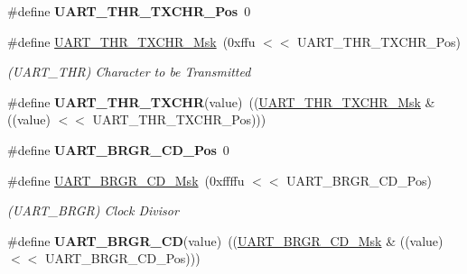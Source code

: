 \begin{DoxyCompactItemize}
\#define {\bfseries U\+A\+R\+T\+\_\+\+T\+H\+R\+\_\+\+T\+X\+C\+H\+R\+\_\+\+Pos}~0
\item 
\mbox{\label{group__SAME70__UART_ga81879da01aac4e5cf429e9707ab48983}} 
\#define \mbox{\hyperlink{group__SAME70__UART_ga81879da01aac4e5cf429e9707ab48983}{U\+A\+R\+T\+\_\+\+T\+H\+R\+\_\+\+T\+X\+C\+H\+R\+\_\+\+Msk}}~(0xffu $<$$<$ U\+A\+R\+T\+\_\+\+T\+H\+R\+\_\+\+T\+X\+C\+H\+R\+\_\+\+Pos)
\begin{DoxyCompactList}\small\item\em (U\+A\+R\+T\+\_\+\+T\+HR) Character to be Transmitted \end{DoxyCompactList}\item 
\mbox{\label{group__SAME70__UART_ga2234b30af6b81e5870b59df7c2de935d}} 
\#define {\bfseries U\+A\+R\+T\+\_\+\+T\+H\+R\+\_\+\+T\+X\+C\+HR}(value)~((\mbox{\hyperlink{group__SAMV71__UART_ga81879da01aac4e5cf429e9707ab48983}{U\+A\+R\+T\+\_\+\+T\+H\+R\+\_\+\+T\+X\+C\+H\+R\+\_\+\+Msk}} \& ((value) $<$$<$ U\+A\+R\+T\+\_\+\+T\+H\+R\+\_\+\+T\+X\+C\+H\+R\+\_\+\+Pos)))
\item 
\mbox{\label{group__SAME70__UART_gabe3a466943beb76f450710c221602c20}} 
\#define {\bfseries U\+A\+R\+T\+\_\+\+B\+R\+G\+R\+\_\+\+C\+D\+\_\+\+Pos}~0
\item 
\mbox{\label{group__SAME70__UART_ga73b3dd57455736468a4feb1ac356ccf5}} 
\#define \mbox{\hyperlink{group__SAME70__UART_ga73b3dd57455736468a4feb1ac356ccf5}{U\+A\+R\+T\+\_\+\+B\+R\+G\+R\+\_\+\+C\+D\+\_\+\+Msk}}~(0xffffu $<$$<$ U\+A\+R\+T\+\_\+\+B\+R\+G\+R\+\_\+\+C\+D\+\_\+\+Pos)
\begin{DoxyCompactList}\small\item\em (U\+A\+R\+T\+\_\+\+B\+R\+GR) Clock Divisor \end{DoxyCompactList}\item 
\mbox{\label{group__SAME70__UART_gac9dea7b4cd4fbe4efc6c09f21aff1b9d}} 
\#define {\bfseries U\+A\+R\+T\+\_\+\+B\+R\+G\+R\+\_\+\+CD}(value)~((\mbox{\hyperlink{group__SAMV71__UART_ga73b3dd57455736468a4feb1ac356ccf5}{U\+A\+R\+T\+\_\+\+B\+R\+G\+R\+\_\+\+C\+D\+\_\+\+Msk}} \& ((value) $<$$<$ U\+A\+R\+T\+\_\+\+B\+R\+G\+R\+\_\+\+C\+D\+\_\+\+Pos)))
\item 
\mbox{\label{group__SAME70__UART_ga2059ccc27426201efaaf6a053939bdab}} 

\end{DoxyCompactItemize}
